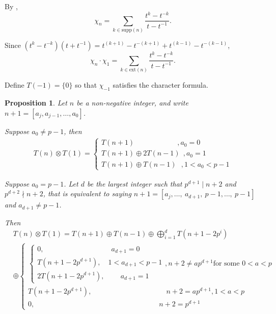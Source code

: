 \documentclass[11 pt]{amsart}
\theoremstyle{plain}
\newtheorem{prop}[thm]{Proposition}
\theoremstyle{definition}
\theoremstyle{remark}
\def\xx{\otimes}
\def\supp{\text{supp}}
\def\ext{\text{ext}}
\begin{document}
By \cite[, Proposition 5.4]{tubbenhauer2021quivers}, \begin{equation} \label{char_n}
    \chi_n= \sum_{k \in \supp(n)} \frac{t^k-t^{-k}}{t-t^{-1}}.
\end{equation}

Since $(t^k - t^{-k})(t+t^{-1})=t^{(k+1)}-t^{-(k+1)}+t^{(k-1)}-t^{-(k-1)}$, \[ \chi_n \cdot \chi_1 = \sum_{k \in \ext(n)} \frac{t^k-t^{-k}}{t-t^{-1}}. \]


Define $T(-1)=\{0\}$ so that $\chi_{-1}$ satisfies the character formula.

\begin{prop} \label{decompT(m).T(1)}
Let $n$ be a non-negative integer, and write $n+1=[a_j, a_{j-1}, \ldots, a_0]$. 

Suppose $a_0 \neq p-1$, then  \begin{align*}
    T(n)\xx T(1)=\begin{cases}
        T(n+1) \quad \quad \quad \quad \quad \quad,a_0=0\\
        T(n+1)\oplus 2T(n-1) \ \  ,a_0=1\\
        T(n+1)\oplus T(n-1)\ \ \ , 1<a_0<p-1  \end{cases}
\end{align*}

        Suppose $a_0=p-1$. Let $d$ be the largest integer such that $p^{d+1} \mid n+2$ and $p^{d+2} \nmid n+2$, that is equivalent to saying $n+1=[a_j, \ldots,\   a_{d+1},\  p-1, \ldots, \ p-1]$ and $a_{d+1} \neq p-1$. 
        
        Then 
\begin{align*}
     &T(n)\xx T(1)=T(n+1)\oplus T(n-1) \oplus 
     \bigoplus_{i=1}^d T(n+1-2p^i)\\
     &\oplus \begin{cases}
             \begin{cases}
                0, \qquad \qquad \qquad \qquad \quad \ \ a_{d+1}=0\\
                T(n+1-2p^{d+1}), \quad 1<a_{d+1}<p-1\\
                2T(n+1-2p^{d+1}), \qquad \  a_{d+1}=1
            \end{cases}, n+2\neq ap^{d+1} \text{for some $0<a<p$} \\
 T(n+1-2p^{d+1}), \qquad \qquad \qquad \qquad \qquad \ \  n+2=ap^{d+1}, 1<a<p\\
 0, \qquad \qquad \qquad \qquad \qquad \qquad \qquad \qquad \quad \ \ n+2=p^{d+1} %
        \end{cases}
\end{align*}
       \end{prop}
\end{document}
